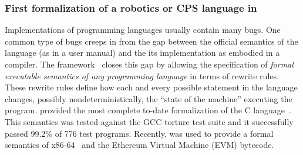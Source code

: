 
%


\subsubsection{First formalization of a robotics or CPS language in \K}
Implementations of programming languages usually contain many bugs. One common type of bugs creeps in from the gap between the official semantics of the language (as in a user manual) and the its implementation as embodied in a compiler. The \K framework~\cite{rosu-serbanuta-2013-k} closes this gap by allowing the specification of {\em  formal executable semantics of any programming language} in terms of rewrite rules. These rewrite rules define how each and every possible statement in the  language changes, possibly nondeterministically, the ``state of the machine'' executing the program. 
%
\K  provided the most complete to-date formalization  of the C language~\cite{KC}. This semantics was tested against the GCC torture test suite and it successfully passed 99.2\% of 776 test programs. Recently, \K  was used to provide a formal semantics of x86-64~\cite{rosuadvepaper} and the Ethereum Virtual Machine (EVM) bytecode. 


